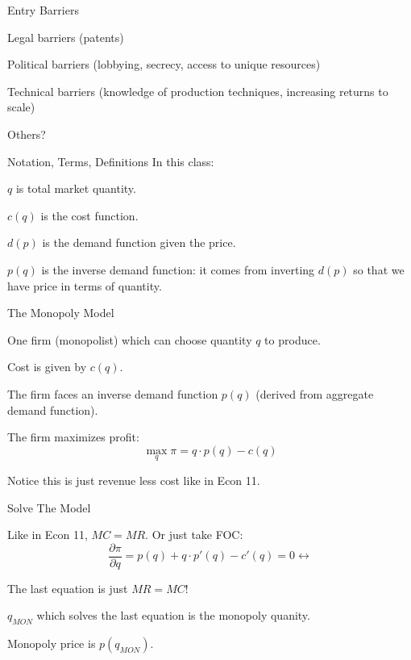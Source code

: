\documentclass[aspectratio=169]{beamer}
\newenvironment{wideitemize}{\itemize\addtolength{\itemsep}{10pt}}{\enditemize}
\begin{document}
\begin{frame}{Entry Barriers}

\begin{wideitemize}
        \item Legal barriers (patents)
        \item Political barriers (lobbying, secrecy, access to unique resources)
        \item Technical barriers (knowledge of production techniques, increasing returns to scale)
        \item Others?
\end{wideitemize}
    
\end{frame}

\begin{frame}{Notation, Terms, Definitions}
In this class:
    \begin{wideitemize}
            \item $q$ is total market quantity.
            \item $c(q)$ is the cost function.
            \item $d(p)$ is the demand function given the price.
            \item $p(q)$ is the inverse demand function: it comes from inverting $d(p)$ so that we have price in terms of quantity.
    \end{wideitemize}
\end{frame}

\begin{frame}{The Monopoly Model}
\begin{wideitemize}
        \item One firm (monopolist) which can choose quantity $q$ to produce.
        \item Cost is given by $c(q)$.
        \item The firm faces an inverse demand function $p(q)$ (derived from aggregate demand function).
        \item The firm maximizes profit:
        \[\max_q \pi = q\cdot p(q) - c(q) \]
        \item Notice this is just revenue less cost like in Econ 11.
        \end{wideitemize}
\end{frame}

\begin{frame}{Solve The Model}
    \begin{wideitemize}
            \item Like in Econ 11, $MC=MR$. Or just take FOC:
            \[\frac{\partial \pi}{\partial q} = p(q) +q\cdot p'(q) - c'(q) =0 \leftrightarrow \]
            \item The last equation is just $MR=MC$!
            \item $q_{MON}$ which solves the last equation is the monopoly quanity.
            \item Monopoly price is $p(q_{MON})$.
    \end{wideitemize}
\end{frame}
\end{document}
